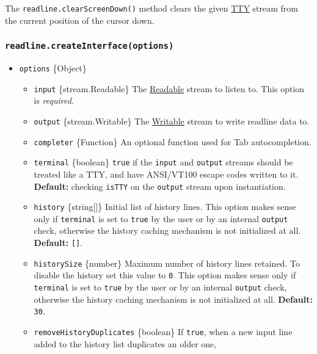 The \texttt{readline.clearScreenDown()} method clears the given
\href{tty.md}{TTY} stream from the current position of the cursor down.

\subsubsection{\texorpdfstring{\texttt{readline.createInterface(options)}}{readline.createInterface(options)}}\label{readline.createinterfaceoptions}

\begin{itemize}
\tightlist
\item
  \texttt{options} \{Object\}

  \begin{itemize}
  \tightlist
  \item
    \texttt{input} \{stream.Readable\} The
    \href{stream.md\#readable-streams}{Readable} stream to listen to.
    This option is \emph{required}.
  \item
    \texttt{output} \{stream.Writable\} The
    \href{stream.md\#writable-streams}{Writable} stream to write
    readline data to.
  \item
    \texttt{completer} \{Function\} An optional function used for Tab
    autocompletion.
  \item
    \texttt{terminal} \{boolean\} \texttt{true} if the \texttt{input}
    and \texttt{output} streams should be treated like a TTY, and have
    ANSI/VT100 escape codes written to it. \textbf{Default:} checking
    \texttt{isTTY} on the \texttt{output} stream upon instantiation.
  \item
    \texttt{history} \{string{[}{]}\} Initial list of history lines.
    This option makes sense only if \texttt{terminal} is set to
    \texttt{true} by the user or by an internal \texttt{output} check,
    otherwise the history caching mechanism is not initialized at all.
    \textbf{Default:} \texttt{{[}{]}}.
  \item
    \texttt{historySize} \{number\} Maximum number of history lines
    retained. To disable the history set this value to \texttt{0}. This
    option makes sense only if \texttt{terminal} is set to \texttt{true}
    by the user or by an internal \texttt{output} check, otherwise the
    history caching mechanism is not initialized at all.
    \textbf{Default:} \texttt{30}.
  \item
    \texttt{removeHistoryDuplicates} \{boolean\} If \texttt{true}, when
    a new input line added to the history list duplicates an older one,

\end{itemize}
\end{itemize}
